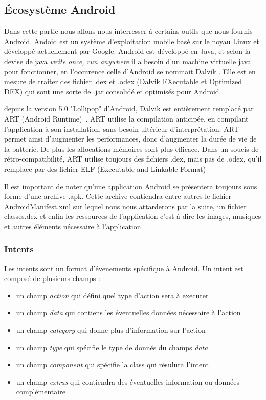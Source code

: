 \documentclass[12pt]{article}
\begin{document}
\subsection{Écosystème Android}
Dans cette partie nous allons nous interresser à certains outils que nous fournis Android.
Andoid est un système d'exploitation mobile basé sur le noyau Linux et développé actuellement par Google.
Android est développé en Java, et selon la devise de java \textit{\og write once, run anywhere\fg{}} il a besoin d'un machine virtuelle java pour fonctionner, en l'occurence celle d'Android se  nommait \og Dalvik \fg{}. Elle est en mesure de traiter des fichier .dex et .odex (Dalvik EXecutable et Optimized DEX) qui sont une sorte de .jar consolidé et optimisés pour Android.

depuis la version 5.0 "Lollipop" d'Android, Dalvik est entièrement remplacé par ART (Android Runtime)~\cite{ART}. ART utilise la compilation anticipée, en compilant l'application à son installation, sans besoin ultérieur d'interprétation. ART permet ainsi d'augmenter les performances, donc d'augmenter la durée de vie de la batterie. De plus les allocations mémoires sont plus efficace. Dans un soucis de rétro-compatibilité, ART utilise toujours des fichiers .dex, mais pas de .odex, qu'il remplace par des fichier ELF (Executable and Linkable Format)

Il est important de noter qu'une application Android se présentera toujours sous forme d'une archive .apk. Cette archive contiendra entre autres le fichier AndroidManifest.xml sur lequel nous nous attarderons par la suite, un fichier classes.dex et enfin les ressources de l'application c'est à dire les images, musiques et autres éléments nécessaire à l'application.

\subsubsection{Intents}
Les intents sont un format d'évenements spécifique à Android. Un intent est composé de plusieurs champs : 
\begin{itemize}
\item un champ \textit{action} qui défini quel type d'action sera à executer
\item un champ \textit{data} qui contiens les éventuelles données nécessaire à l'action
\item un champ \textit{category} qui donne plus d'information sur l'action
\item un champ \textit{type} qui spécifie le type de donnés du champs \textit{data}
\item un champ \textit{component} qui spécifie la class qui résulura l'intent
\item un champ \textit{extras} qui contiendra des éventuelles information ou données complémentaire
\end{itemize}
\end{document}
